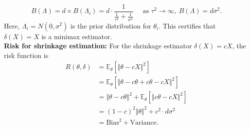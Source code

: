 \documentclass[a4paper]{article}
\begin{document}
\begin{equation}
	B(\Lambda) = d \times B(\Lambda_i) = d \cdot \frac{1}{\frac{1}{\tau^2} + \frac{1}{\sigma^2}} \quad \text{ as } \tau^2 \to \infty, \ B(\Lambda) = d\sigma^2.
\end{equation}
Here, $\Lambda_i = N(0,\sigma^2)$ is the prior distribution for $\theta_i$. This certifies that $\delta(X) = X$ is a minimax estimator.\\
\newline
\textbf{Risk for shrinkage estimation:} For the shrinkage estimator $\delta(X) = cX$, the risk function is
\begin{equation}
	\begin{aligned}
		R(\theta,\delta) &= \mathbb{E}_\theta[\Vert \theta - cX \Vert^2] \\
		&= \mathbb{E}_\theta[\Vert \theta - c\theta + c\theta - cX \Vert^2] \\
		&= \Vert \theta - c\theta\Vert^2 + \mathbb{E}_\theta[\Vert c\theta - cX \Vert^2] \\
		&= (1-c)^2 \Vert \theta \Vert ^2 + c^2 \cdot d\sigma^2 \\
		&= \text{Bias}^2 + \text{Variance}.
	\end{aligned}
\end{equation}
\end{document}
